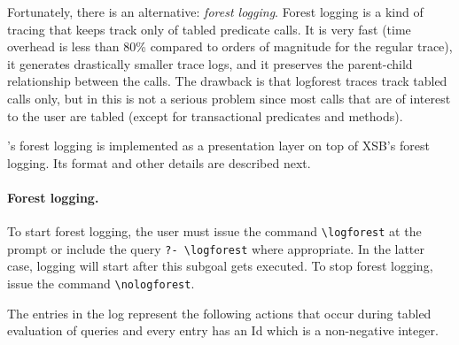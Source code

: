 \documentclass[11pt]{article}
\newcommand{\ERGO}{\mbox{\smaller{\ensuremath{\cal{E}}\smaller{{\sc{RGO}}}}}\xspace}
\newcommand{\FLSYSTEM}{\ERGO}
\newcommand{\bs}{\textbackslash}
\begin{document}
Fortunately, there is an alternative: \emph{forest logging}.
Forest logging is a kind of tracing that keeps track only of tabled
predicate calls. It is very fast (time overhead is less than 80\% compared
to orders of magnitude for the regular trace), it generates
drastically smaller trace logs, and it preserves the parent-child
relationship between the calls. The drawback is that logforest
traces track tabled calls
only, but in \FLSYSTEM this is not a serious problem since most calls that
are of interest to the user are
tabled (except for transactional predicates and methods).

\FLSYSTEM's forest logging is 
implemented as a presentation layer on top of XSB's forest logging.
Its format and other details are described next.

\paragraph{Forest logging.}
To start forest logging, the user
must issue the command {\tt \bs{}logforest} at the \FLSYSTEM
prompt or include the query {\tt ?- \bs{}logforest} where appropriate.
In the latter case, logging will start after this subgoal gets executed. 
To stop forest logging, issue the command {\tt \bs{}nologforest}. 

The entries in the log represent the following actions that occur during
tabled evaluation of queries and every entry has an Id which is a
non-negative integer. 
\end{document}
